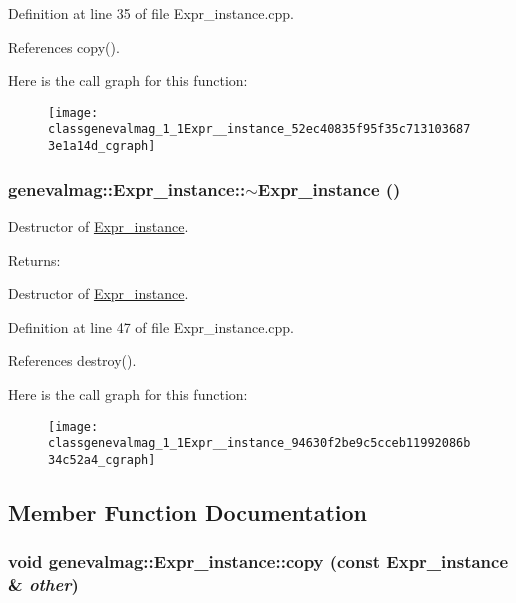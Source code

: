 Definition at line 35 of file Expr\_\-instance.cpp.

References copy().

Here is the call graph for this function:\nopagebreak
\begin{figure}[H]
\begin{center}
\leavevmode
\texttt{[image: classgenevalmag\_1\_1Expr\_\_instance\_52ec40835f95f35c7131036873e1a14d\_cgraph]}
\end{center}
\end{figure}
\hypertarget{classgenevalmag_1_1Expr__instance_94630f2be9c5cceb11992086b34c52a4}{
\subsubsection[{$\sim$Expr\_\-instance}]{\setlength{\rightskip}{0pt plus 5cm}genevalmag::Expr\_\-instance::$\sim$Expr\_\-instance ()}}
\label{classgenevalmag_1_1Expr__instance_94630f2be9c5cceb11992086b34c52a4}


Destructor of \hyperlink{classgenevalmag_1_1Expr__instance}{Expr\_\-instance}. \begin{Desc}
\item[Returns:]\end{Desc}
Destructor of \hyperlink{classgenevalmag_1_1Expr__instance}{Expr\_\-instance}. 

Definition at line 47 of file Expr\_\-instance.cpp.

References destroy().

Here is the call graph for this function:\nopagebreak
\begin{figure}[H]
\begin{center}
\leavevmode
\texttt{[image: classgenevalmag\_1\_1Expr\_\_instance\_94630f2be9c5cceb11992086b34c52a4\_cgraph]}
\end{center}
\end{figure}


\subsection{Member Function Documentation}
\hypertarget{classgenevalmag_1_1Expr__instance_b30d416247a861949c7341fed475a88b}{
\subsubsection[{copy}]{\setlength{\rightskip}{0pt plus 5cm}void genevalmag::Expr\_\-instance::copy (const {\bf Expr\_\-instance} \& {\em other})}}
\label{classgenevalmag_1_1Expr__instance_b30d416247a861949c7341fed475a88b}


